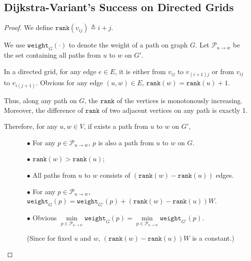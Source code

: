 \documentclass{article}
\begin{document}
\vspace{1em}
\subsection{Dijkstra-Variant's Success on Directed Grids}
\vspace{1em}
\begin{proof}
    We define $\mathtt{rank}(v_{ij})\triangleq i+j$. 
    
    \hspace{1.36em}
    We use $\mathtt{weight}_G(\cdot)$ to denote the weight of a path on graph $G$. Let $\mathcal{P}_{u\rightarrow w}$ be the set containing all paths from $u$ to $w$ on $G'$.
    
    \vspace{1em} \hspace{1.3em}
    In a directed grid, for any edge $e\in E$, it is either from $v_{ij}$ to $v_{(i+1)j}$ or from $v_{ij}$ to $v_{i(j+1)}$. Obvious for any edge $(u,w)\in E$, $\mathtt{rank}(w)=\mathtt{rank}(u)+1.$
    
    \hspace{1.3em}
    Thus, along any path on $G$, the $\mathtt{rank}$ of the vertices is monotonously increasing. Moreover, the difference of $\mathtt{rank}$ of two adjacent vertices on any path is exactly 1.
    
    \hspace{1.3em}
    Therefore, for any $u,w\in V$, if exists a path from $u$ to $w$ on $G'$, 
    
    \begin{itemize}
        \item[] \begin{itemize}
            \item[$\bullet$] For any $p\in\mathcal{P}_{u\rightarrow w}$, $p$ is also a path from $u$ to $w$ on $G$.
            \item[$\bullet$] $\mathtt{rank}(w)>\mathtt{rank}(u)$;
            \item[$\bullet$] All paths from $u$ to $w$ consists of  $\left(\mathtt{rank}(w)-\mathtt{rank}(u)\right)$ edges.
            \item[$\bullet$] For any $p\in\mathcal{P}_{u\rightarrow w}$, $\mathtt{weight}_G(p) = \mathtt{weight}_{G'}(p) + \left(\mathtt{rank}(w)-\mathtt{rank}(u)\right)W$.
            \item[$\bullet$] Obvious $\underset{p\in\mathcal{P}_{u\rightarrow w}}{\min}\mathtt{weight}_G(p)=\underset{p\in\mathcal{P}_{u\rightarrow w}}{\min}\mathtt{weight}_{G'}(p).$ 
            \item[] (Since for fixed $u$ and $w$, $\left(\mathtt{rank}(w)-\mathtt{rank}(u)\right)W$ is a constant.)
        \end{itemize}
    \end{itemize}
    

\end{proof}
\end{document}
